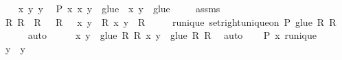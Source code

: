 \begin{isabellebody}
%
\isadelimproof
%
\endisadelimproof
%
\isatagproof
{}\isamarkupfalse%
\isanewline
\ \ \isamarkupfalse%
\ x\ y\ y{\isacharprime}{\kern0pt}\ \isamarkupfalse%
\ {\isachardoublequoteopen}P\ x{\isachardoublequoteclose}\ {\isachardoublequoteopen}{\isasymlangle}x{\isacharcomma}{\kern0pt}\ y{\isasymrangle}\ {\isasymin}\ glue\ {\isasymR}{\isachardoublequoteclose}\ {\isachardoublequoteopen}{\isasymlangle}x{\isacharcomma}{\kern0pt}\ y{\isacharprime}{\kern0pt}{\isasymrangle}\ {\isasymin}\ glue\ {\isasymR}{\isachardoublequoteclose}\isanewline
\ \ \isamarkupfalse%
\ assms\ \isamarkupfalse%
\ R\ R{\isacharprime}{\kern0pt}\ \ {\isachardoublequoteopen}R\ {\isasymin}\ {\isasymR}{\isachardoublequoteclose}\ {\isachardoublequoteopen}R{\isacharprime}{\kern0pt}\ {\isasymin}\ {\isasymR}{\isachardoublequoteclose}\ {\isachardoublequoteopen}{\isasymlangle}x{\isacharcomma}{\kern0pt}\ y{\isasymrangle}\ {\isasymin}\ R{\isachardoublequoteclose}\ {\isachardoublequoteopen}{\isasymlangle}x{\isacharcomma}{\kern0pt}\ y{\isacharprime}{\kern0pt}{\isasymrangle}\ {\isasymin}\ R{\isacharprime}{\kern0pt}{\isachardoublequoteclose}\isanewline
\ \ \ \ \ runique{\isacharcolon}{\kern0pt}\ {\isachardoublequoteopen}set{\isacharunderscore}{\kern0pt}right{\isacharunderscore}{\kern0pt}unique{\isacharunderscore}{\kern0pt}on\ P\ {\isacharparenleft}{\kern0pt}glue\ {\isacharbraceleft}{\kern0pt}R{\isacharcomma}{\kern0pt}\ R{\isacharprime}{\kern0pt}{\isacharbraceright}{\kern0pt}{\isacharparenright}{\kern0pt}{\isachardoublequoteclose}\isanewline
\ \ \ \ \isamarkupfalse%
\ auto\isanewline
\ \ \isamarkupfalse%
\ \isamarkupfalse%
\ {\isachardoublequoteopen}{\isasymlangle}x{\isacharcomma}{\kern0pt}\ y{\isasymrangle}\ {\isasymin}\ {\isacharparenleft}{\kern0pt}glue\ {\isacharbraceleft}{\kern0pt}R{\isacharcomma}{\kern0pt}\ R{\isacharprime}{\kern0pt}{\isacharbraceright}{\kern0pt}{\isacharparenright}{\kern0pt}{\isachardoublequoteclose}\ {\isachardoublequoteopen}{\isasymlangle}x{\isacharcomma}{\kern0pt}\ y{\isacharprime}{\kern0pt}{\isasymrangle}\ {\isasymin}\ {\isacharparenleft}{\kern0pt}glue\ {\isacharbraceleft}{\kern0pt}R{\isacharcomma}{\kern0pt}\ R{\isacharprime}{\kern0pt}{\isacharbraceright}{\kern0pt}{\isacharparenright}{\kern0pt}{\isachardoublequoteclose}\ \isamarkupfalse%
\ auto\isanewline
\ \ \isamarkupfalse%
\ {\isacartoucheopen}P\ x{\isacartoucheclose}\ runique\ \isamarkupfalse%
\ {\isachardoublequoteopen}y\ {\isacharequal}{\kern0pt}\ y{\isacharprime}{\kern0pt}{\isachardoublequoteclose}\ \isamarkupfalse%

\end{isabellebody}
